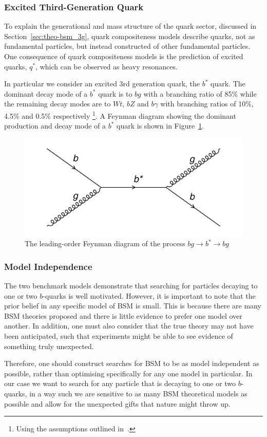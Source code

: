 \subsubsection{Excited Third-Generation Quark}
\label{sec:theo-bsm_bstar}

To explain the generational and mass structure of the quark sector, discussed in Section~\ref{sec:theo-bsm_3g},
quark compositeness models describe quarks, not as fundamental particles, but instead constructed of other fundamental particles.
One consequence of quark compositeness models is the prediction of excited quarks, $q^{*}$, which can be observed as heavy resonances.

In particular we consider an excited 3rd generation quark, the $b^{*}$ quark.
The dominant decay mode of a $b^{*}$ quark is to $bg$ with a branching ratio of 85\%
while the remaining decay modes are to $Wt$, $bZ$ and $b\gamma$ with branching ratios of 10\%, 4.5\% and 0.5\% respectively
\footnote{Using the assumptions outlined in~\cite{theo-bsm_bstar}.}.
A Feynman diagram showing the  dominant production and decay mode of a $b^*$ quark is shown in Figure~\ref{fig:theo-bsm_bstar}.

\begin{figure}[!hbt]
  \begin{center}
    \includegraphics[width=0.7\linewidth, angle=0]{figs/Theory/bsm_bstar.png}
  \end{center}
  \caption{The leading-order Feynman diagram of the process $bg \to b^* \to bg$}
  \label{fig:theo-bsm_bstar}
\end{figure}


\subsubsection{Model Independence}

The two benchmark models demonstrate that searching for particles decaying to one or two $b$-quarks
is well motivated.
However, it is important to note that the prior belief in any specific model of BSM is small.
This is because there are many BSM theories proposed
and there is little evidence to prefer one model over another.
In addition, one must also consider that the true theory may not have been anticipated,
such that experiments might be able to see evidence of something truly unexpected.

Therefore, one should construct searches for BSM to be as model independent as possible,
rather than optimising specifically for any one model in particular.
In our case we want to search for any particle that is decaying to one or two
$b$-quarks, in a way such we are sensitive to as many BSM theoretical models as possible
and allow for the unexpected gifts that nature might throw up.
